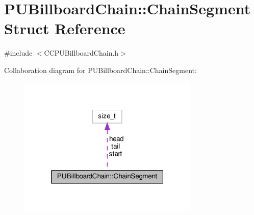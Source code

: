 \hypertarget{structPUBillboardChain_1_1ChainSegment}{}\section{P\+U\+Billboard\+Chain\+:\+:Chain\+Segment Struct Reference}
\label{structPUBillboardChain_1_1ChainSegment}


{\ttfamily \#include $<$C\+C\+P\+U\+Billboard\+Chain.\+h$>$}



Collaboration diagram for P\+U\+Billboard\+Chain\+:\+:Chain\+Segment\+:
\nopagebreak
\begin{figure}[H]
\begin{center}
\leavevmode
\includegraphics[width=244pt]{structPUBillboardChain_1_1ChainSegment__coll__graph}
\end{center}
\end{figure}
